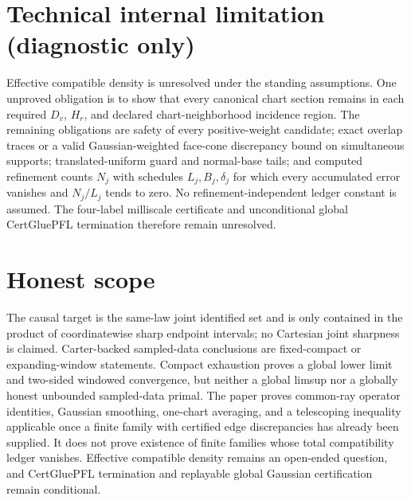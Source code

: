 \documentclass{article}
\begin{document}
\section*{Technical internal limitation (diagnostic only)}

Effective compatible density is unresolved under the standing assumptions. One unproved obligation is to show that every canonical chart section remains in each required \(D_v\), \(H_r\), and declared chart-neighborhood incidence region. The remaining obligations are safety of every positive-weight candidate; exact overlap traces or a valid Gaussian-weighted face-cone discrepancy bound on simultaneous supports; translated-uniform guard and normal-base tails; and computed refinement counts \(N_j\) with schedules \(L_j,B_j,\delta_j\) for which every accumulated error vanishes and \(N_j/L_j\) tends to zero. No refinement-independent ledger constant is assumed. The four-label milliscale certificate and unconditional global CertGluePFL termination therefore remain unresolved.

\section{Honest scope}

The causal target is the same-law joint identified set and is only contained in the product of coordinatewise sharp endpoint intervals; no Cartesian joint sharpness is claimed. Carter-backed sampled-data conclusions are fixed-compact or expanding-window statements. Compact exhaustion proves a global lower limit and two-sided windowed convergence, but neither a global limsup nor a globally honest unbounded sampled-data primal. The paper proves common-ray operator identities, Gaussian smoothing, one-chart averaging, and a telescoping inequality applicable once a finite family with certified edge discrepancies has already been supplied. It does not prove existence of finite families whose total compatibility ledger vanishes. Effective compatible density remains an open-ended question, and CertGluePFL termination and replayable global Gaussian certification remain conditional.
\end{document}
